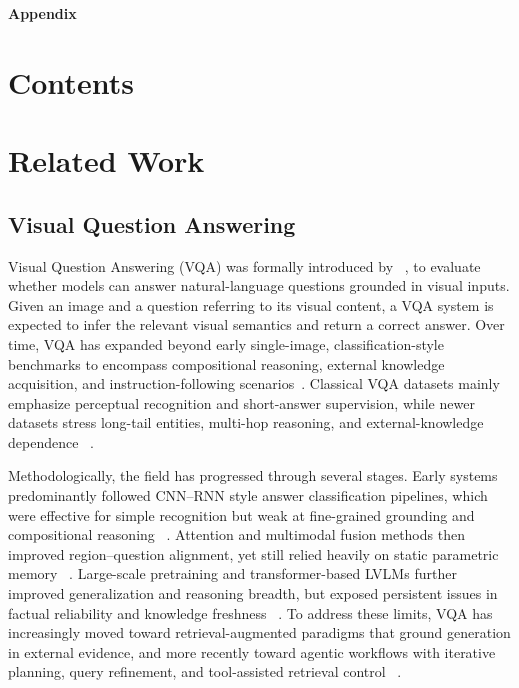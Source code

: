 \documentclass{article} %
\begin{document}
\clearpage


\clearpage
\appendix
\onecolumn
\textbf{\Large Appendix}


\startcontents[appendix]

\vspace{1em}
\section*{Contents}

\clearpage
\section{Related Work}
\subsection{Visual Question Answering}
Visual Question Answering (VQA) was formally introduced by ~\citep{antol2015vqa}, to evaluate whether models can answer natural-language questions grounded in visual inputs. 
Given an image and a question referring to its visual content, a VQA system is expected to infer the relevant visual semantics and return a correct answer. 
Over time, VQA has expanded beyond early single-image, classification-style benchmarks to encompass compositional reasoning, external knowledge acquisition, and instruction-following scenarios~\citep{antol2015vqa, hudson2019gqa}.
Classical VQA datasets mainly emphasize perceptual recognition and short-answer supervision, while newer datasets stress long-tail entities, multi-hop reasoning, and external-knowledge dependence ~\citep{marino2019ok, schwenk2022okvqa}. 

Methodologically, the field has progressed through several stages. 
Early systems predominantly followed CNN--RNN style answer classification pipelines, which were effective for simple recognition but weak at fine-grained grounding and compositional reasoning ~\citep{kazemi2017show}. 
Attention and multimodal fusion methods then improved region--question alignment, yet still relied heavily on static parametric memory ~\citep{lu2016hierarchical}. 
Large-scale pretraining and transformer-based LVLMs further improved generalization and reasoning breadth, but exposed persistent issues in factual reliability and knowledge freshness ~\citep{chen2019uniter}. 
To address these limits, VQA has increasingly moved toward retrieval-augmented paradigms that ground generation in external evidence, and more recently toward agentic workflows with iterative planning, query refinement, and tool-assisted retrieval control ~\citep{abootorabi2025ask,mei2025survey}.
\end{document}
